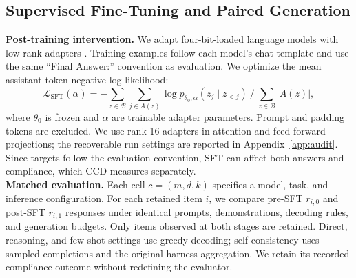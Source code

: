 \documentclass{article}
\begin{document}
\vspace{-2mm}
\subsection{Supervised Fine-Tuning and Paired Generation}
\label{sec:sft_paired}
\vspace{-1mm}

\noindent\textbf{Post-training intervention.}
We adapt four-bit-loaded language models with low-rank adapters \citep{dettmers2023qlora}. Training examples follow each model's chat template and use the same ``Final Answer:'' convention as evaluation. We optimize the mean assistant-token negative log likelihood:
\setcounter{equation}{1}
\begin{equation}
\mathcal{L}_{\mathrm{SFT}}(\alpha)
=-{
\sum_{z\in\mathcal{B}}
\sum_{j\in A(z)}
\log p_{\theta_0,\alpha}(z_j\mid z_{<j})
}
\mathbin{/}
{
\sum_{z\in\mathcal{B}} |A(z)|
},
\label{eq:sft_loss}
\end{equation}
where \(\theta_0\) is frozen and \(\alpha\) are trainable adapter parameters. Prompt and padding tokens are excluded. We use rank 16 adapters in attention and feed-forward projections; the recoverable run settings are reported in Appendix~\ref{app:audit}. Since targets follow the evaluation convention, SFT can affect both answers and compliance, which CCD measures separately.
\\
\noindent\textbf{Matched evaluation.}
Each cell \(c=(m,d,k)\) specifies a model, task, and inference configuration. For each retained item \(i\), we compare pre-SFT \(r_{i,0}\) and post-SFT \(r_{i,1}\) responses under identical prompts, demonstrations, decoding rules, and generation budgets. Only items observed at both stages are retained. Direct, reasoning, and few-shot settings use greedy decoding; self-consistency uses sampled completions and the original harness aggregation. We retain its recorded compliance outcome without redefining the evaluator.

\vspace{-2mm}
\end{document}
